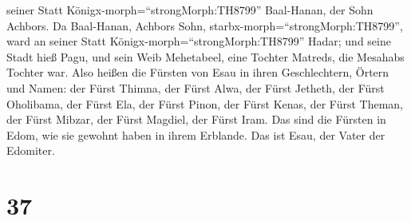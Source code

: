 seiner Statt Königx-morph=``strongMorph:TH8799'' Baal-Hanan, der Sohn
Achbors.  Da Baal-Hanan, Achbors Sohn,
starbx-morph=``strongMorph:TH8799'', ward an seiner Statt
Königx-morph=``strongMorph:TH8799'' Hadar; und seine Stadt hieß Pagu,
und sein Weib Mehetabeel, eine Tochter Matreds, die Mesahabs Tochter
war.  Also heißen die Fürsten von Esau in ihren
Geschlechtern, Örtern und Namen: der Fürst Thimna, der Fürst Alwa, der
Fürst Jetheth,  der Fürst Oholibama, der Fürst Ela, der
Fürst Pinon,  der Fürst Kenas, der Fürst Theman, der Fürst
Mibzar,  der Fürst Magdiel, der Fürst Iram. Das sind die
Fürsten in Edom, wie sie gewohnt haben in ihrem Erblande. Das ist Esau,
der Vater der Edomiter.

\hypertarget{section-36}{%
\section{37}\label{section-36}}

